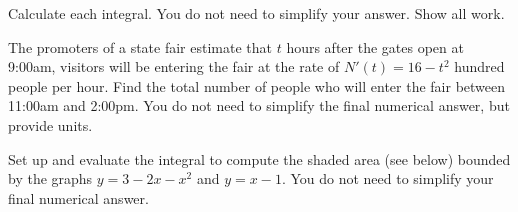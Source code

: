 \documentclass[addpoints,12pt]{exam}
\newcommand{\ds}{\displaystyle}
\begin{document}
\begin{questions}

\question

Calculate each integral. You do not need to simplify your answer. Show all work.


\newpage




\question[8] The promoters of a state fair estimate that $t$ hours after the gates open at
9:00am, visitors will be entering the fair at the rate of $N'(t)=16-t^2$ hundred people per hour.
Find the total number of people who will enter the fair between 11:00am and 2:00pm. You do not
need to simplify the final numerical answer, but provide units.


\newpage

\question[8] Set up and evaluate the integral to compute the shaded area (see below) bounded
by the graphs $y=3-2x-x^2$ and $y=x-1$. You do not need to simplify your final numerical
answer.

\end{questions}
\end{document}
